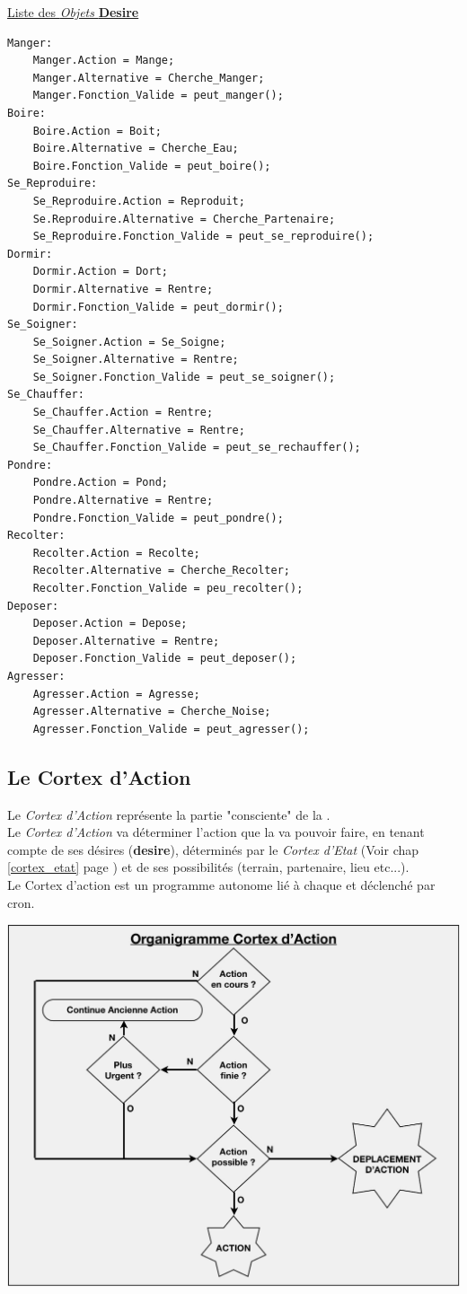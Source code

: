 \documentclass[french]{report}
\begin{document}
\underline{Liste des \textit{Objets} \textbf{Desire}}
\begin{lstlisting}
Manger:
	Manger.Action = Mange;
	Manger.Alternative = Cherche_Manger;
	Manger.Fonction_Valide = peut_manger();
Boire:
	Boire.Action = Boit;
	Boire.Alternative = Cherche_Eau;
	Boire.Fonction_Valide = peut_boire();
Se_Reproduire:
	Se_Reproduire.Action = Reproduit;
	Se.Reproduire.Alternative = Cherche_Partenaire;
	Se_Reproduire.Fonction_Valide = peut_se_reproduire();
Dormir:
	Dormir.Action = Dort;
	Dormir.Alternative = Rentre;
	Dormir.Fonction_Valide = peut_dormir();
Se_Soigner:	
	Se_Soigner.Action = Se_Soigne;
	Se_Soigner.Alternative = Rentre;
	Se_Soigner.Fonction_Valide = peut_se_soigner();
Se_Chauffer:	
	Se_Chauffer.Action = Rentre;
	Se_Chauffer.Alternative = Rentre;
	Se_Chauffer.Fonction_Valide = peut_se_rechauffer();
Pondre:	
	Pondre.Action = Pond;
	Pondre.Alternative = Rentre;
	Pondre.Fonction_Valide = peut_pondre();
Recolter:	
	Recolter.Action = Recolte;
	Recolter.Alternative = Cherche_Recolter;
	Recolter.Fonction_Valide = peu_recolter();
Deposer:	
	Deposer.Action = Depose;
	Deposer.Alternative = Rentre;
	Deposer.Fonction_Valide = peut_deposer();
Agresser:	
	Agresser.Action = Agresse;
	Agresser.Alternative = Cherche_Noise;
	Agresser.Fonction_Valide = peut_agresser();		
\end{lstlisting}	


\newpage

\subsection{Le Cortex d'Action}\label{cortex_action}

Le \textit{Cortex d'Action} représente la partie "consciente" de la \CoCiX.\\
Le \textit{Cortex d'Action} va déterminer l'action que la \CoCiX va pouvoir faire, en tenant compte de ses désires (\textbf{desire}), déterminés par le \textit{Cortex d'Etat} (Voir chap \ref{cortex_etat} page \pageref{cortex_etat}) et de ses possibilités (terrain, partenaire, lieu etc...).\\

Le Cortex d'action est un programme autonome lié à chaque \CoCiX et déclenché par cron.\\

\begin{center}
	\includegraphics[width=0.8\linewidth]{images/cortex_action.jpg}
\end{center}
\end{document}
